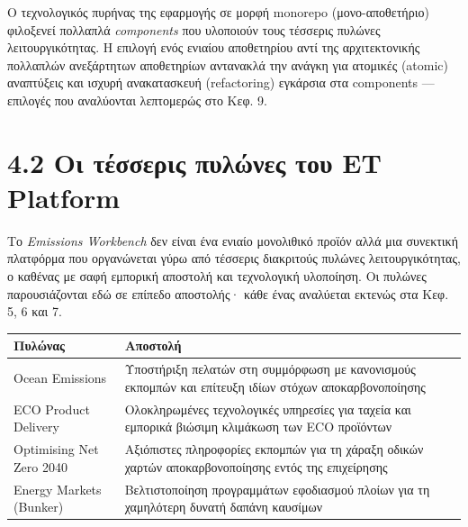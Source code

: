 Ο τεχνολογικός πυρήνας της εφαρμογής σε μορφή monorepo (μονο-αποθετήριο)
φιλοξενεί πολλαπλά \emph{components} που υλοποιούν τους τέσσερις πυλώνες
λειτουργικότητας. Η επιλογή ενός ενιαίου αποθετηρίου αντί της
αρχιτεκτονικής πολλαπλών ανεξάρτητων αποθετηρίων αντανακλά την ανάγκη
για ατομικές (atomic) αναπτύξεις και ισχυρή ανακατασκευή (refactoring)
εγκάρσια στα components --- επιλογές που αναλύονται λεπτομερώς στο Κεφ.
9.

\section{4.2 Οι τέσσερις πυλώνες του ET
Platform}\label{ux3bfux3b9-ux3c4ux3adux3c3ux3c3ux3b5ux3c1ux3b9ux3c2-ux3c0ux3c5ux3bbux3ceux3bdux3b5ux3c2-ux3c4ux3bfux3c5-et-platform}

Το \emph{Emissions Workbench} δεν είναι ένα ενιαίο μονολιθικό προϊόν
αλλά μια συνεκτική πλατφόρμα που οργανώνεται γύρω από τέσσερις
διακριτούς πυλώνες λειτουργικότητας, ο καθένας με σαφή εμπορική αποστολή
και τεχνολογική υλοποίηση. Οι πυλώνες παρουσιάζονται εδώ σε επίπεδο
αποστολής· κάθε ένας αναλύεται εκτενώς στα Κεφ. 5, 6 και 7.

{\def\LTcaptype{} %
\begin{longtable}[]{@{}
  >{\raggedright\arraybackslash}p{}
  >{\raggedright\arraybackslash}p{}@{}}
\toprule\noalign{}
\begin{minipage}[b]{\linewidth}\raggedright
Πυλώνας
\end{minipage} & \begin{minipage}[b]{\linewidth}\raggedright
Αποστολή
\end{minipage} \\
\midrule\noalign{}
\endhead
\bottomrule\noalign{}
\endlastfoot
Ocean Emissions & Υποστήριξη πελατών στη συμμόρφωση με κανονισμούς
εκπομπών και επίτευξη ιδίων στόχων αποκαρβονοποίησης \\
ECO Product Delivery & Ολοκληρωμένες τεχνολογικές υπηρεσίες για ταχεία
και εμπορικά βιώσιμη κλιμάκωση των ECO προϊόντων \\
Optimising Net Zero 2040 & Αξιόπιστες πληροφορίες εκπομπών για τη χάραξη
οδικών χαρτών αποκαρβονοποίησης εντός της επιχείρησης \\
Energy Markets (Bunker) & Βελτιστοποίηση προγραμμάτων εφοδιασμού πλοίων
για τη χαμηλότερη δυνατή δαπάνη καυσίμων \\
\end{longtable}
}

